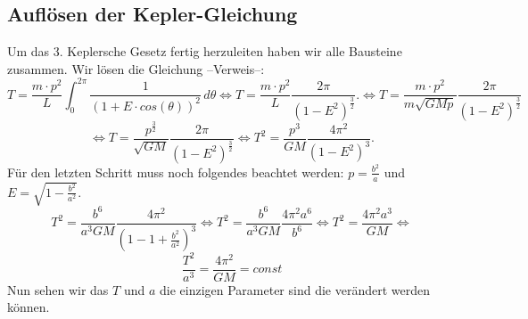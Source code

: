 \subsection{Auflösen der Kepler-Gleichung}
Um das 3. Keplersche Gesetz fertig herzuleiten haben wir alle Bausteine zusammen.
Wir lösen die Gleichung --Verweis--:
\[
T
=
\frac{m \cdot p^2}{L} \int_{0}^{2\pi} \frac{1}{(1+E \cdot cos(\theta))^2}\,d\theta
\Leftrightarrow
T
=
\frac{m \cdot p^2}{L} \frac{2\pi}{(1-E^2)^\frac{3}{2}}.
\Leftrightarrow
T
=
\frac{m \cdot p^2}{m \sqrt{GMp}} \frac{2\pi}{(1-E^2)^\frac{3}{2}}
\]
\[
\Leftrightarrow
T
=
\frac{p^{\frac{3}{2}}}{\sqrt{GM}} \frac{2\pi}{(1-E^2)^\frac{3}{2}}
\Leftrightarrow
T^2
=
\frac{p^3}{GM} \frac{4\pi^2}{(1-E^2)^3}.
\]
Für den letzten Schritt muss noch folgendes beachtet werden: $p=\frac{b^2}{a}$ und $E=\sqrt{1-\frac{b^2}{a^2}}$.
\[
T^2
=
\frac{b^6}{a^3GM} \frac{4\pi^2}{(1-1+\frac{b^2}{a^2})^3}
\Leftrightarrow
T^2
=
\frac{b^6}{a^3GM} \frac{4\pi^2a^6}{b^6}
\Leftrightarrow
T^2
=
\frac{4\pi^2a^3}{GM}
\Leftrightarrow
\]
\[
\boxed{
\frac{T^2}{a^3}
=
\frac{4\pi^2}{GM}
=
const}
\]
Nun sehen wir das $T$ und $a$ die einzigen Parameter sind die verändert werden können.